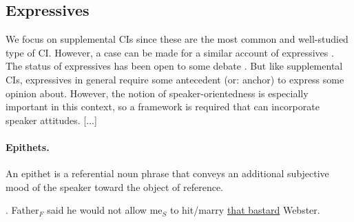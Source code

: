 \subsection{Expressives}

We focus on supplemental CIs since these are the most common and
well-studied type of CI.  However, a case can be made for a similar account
of expressives \citep[including expressive attributive adjectives, epithets,
honorifics, and tense-variations such as the German `Konjunktiv I';
cf.][]{potts2005logic}. The status of expressives has been open to some
debate \citep[...]{potts2004japanese,geurts2007fucking}.  But like
supplemental CIs, expressives in general require some antecedent (or:
anchor) to express some opinion about.
However,
the notion of speaker-orientedness is especially important in this context,
so a framework is required that can incorporate speaker attitudes.
[...]

\paragraph{Epithets.} An epithet is a referential noun phrase that conveys
an additional subjective mood of the speaker toward the object of reference.

\noindent\parbox[b]{\textwidth}{
\ex. Father$_F$ said he would not allow me$_S$ to hit/marry \underline{that bastard} Webster.\\

}


